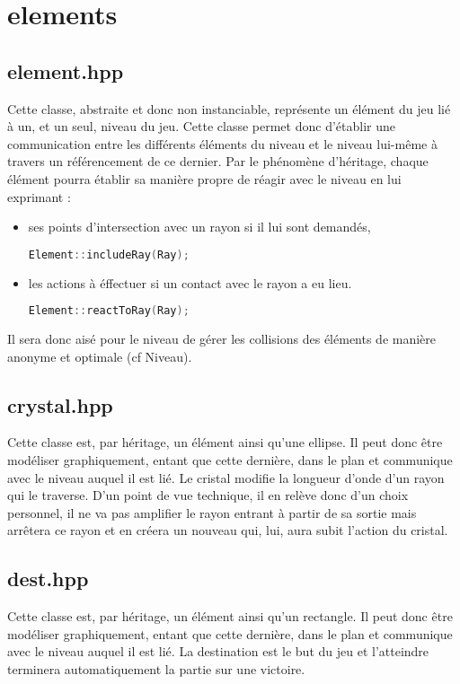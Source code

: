 \documentclass[a4paper,11pt]{report}
\begin{document}
\section[Les éléments]{elements}
\subsection[Element]{element.hpp}
Cette classe, abstraite et donc non instanciable, représente un élément du jeu
lié à un, et un seul, niveau du jeu. Cette classe permet donc d'établir une
communication entre les différents éléments du niveau et le niveau lui-même à
travers un référencement de ce dernier.
Par le phénomène d'héritage, chaque élément pourra établir sa manière propre de
réagir avec le niveau en lui exprimant : 
\begin{itemize}
	\item ses points d'intersection avec un rayon si il lui sont demandés,
		\begin{lstlisting}[language=C++]
		Element::includeRay(Ray);
		\end{lstlisting}
	\item les actions à éffectuer si un contact avec le rayon a eu lieu.
		\begin{lstlisting}[language=C++]
		Element::reactToRay(Ray);
		\end{lstlisting}
\end{itemize}
Il sera donc aisé pour le niveau de gérer les collisions des éléments de manière
anonyme et optimale (cf Niveau).
\subsection[Cristal]{crystal.hpp}
\begin{center}
\end{center}
Cette classe est, par héritage, un élément ainsi qu'une ellipse. Il peut donc
être modéliser graphiquement, entant que cette dernière, dans le plan et communique avec
le niveau auquel il est lié. Le cristal modifie la longueur d'onde d'un rayon
qui le traverse. D'un point de vue technique, il en relève donc d'un choix
personnel, il ne va pas amplifier le rayon entrant à partir de sa sortie mais 
arrêtera ce rayon et en créera un nouveau qui, lui, aura subit l'action du cristal.
\subsection[Destination]{dest.hpp}
Cette classe est, par héritage, un élément ainsi qu'un rectangle. Il peut donc
être modéliser graphiquement, entant que cette dernière, dans le plan et
communique avec le niveau auquel il est lié. La destination est le but du jeu
et l'atteindre terminera automatiquement la partie sur une victoire.
\end{document}

